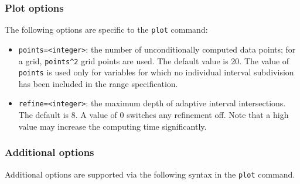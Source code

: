 \subsubsection{Plot options}
\label{gnuplot:plot-options}
The following options are specific to the {\REDUCE} \texttt{plot} command:
\begin{itemize}
   \item \texttt{points=<integer>}: the number of unconditionally
     computed data points; for a grid,
     \texttt{points\textasciicircum2} grid points are used.  The
     default value is 20.  The value of \texttt{points} is used only
     for variables for which no individual interval subdivision has
     been included in the range specification.
   \item \texttt{refine=<integer>}: the maximum depth of adaptive
     interval intersections.  The default is 8.  A value of 0 switches
     any refinement off.  Note that a high value may increase the
     computing time significantly.
\end{itemize}

\subsubsection{Additional options}

Additional {\Gnuplot} options are supported via the following
syntax in the \texttt{plot} command.

